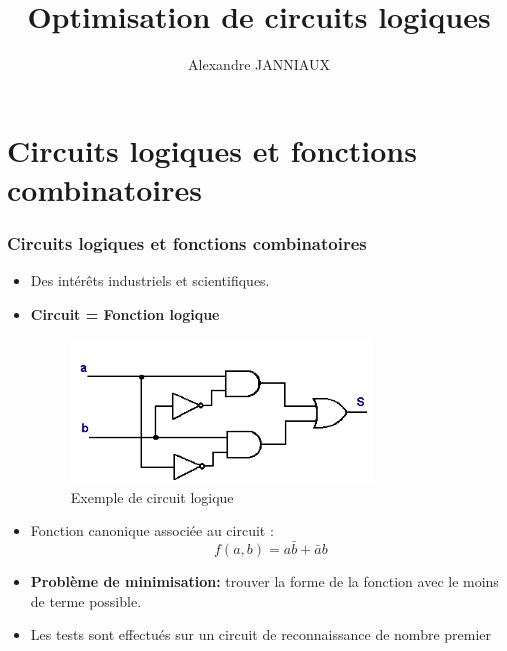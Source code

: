 \documentclass[handout]{beamer}
\title{Optimisation de circuits logiques}
\author{Alexandre JANNIAUX}
\date{}
\begin{document}
\begin{frame}
  \maketitle
  \tableofcontents
\end{frame}

\section{Circuits logiques et fonctions combinatoires}
\begin{frame}
  \frametitle{Circuits logiques et fonctions combinatoires}
  
  \begin{itemize}

   \item Des intérêts industriels et scientifiques.
   \vfill\null
  
   \item \textbf{Circuit = Fonction logique}
   \begin{figure}[p]
   \includegraphics[width=8cm]{circuit_logique2.png}
   \caption{Exemple de circuit logique }
   \label{fig:circ1}
  \end{figure}
  
  \item Fonction canonique associée au circuit : \[f(a,b) = a\bar{b} + \bar{a}b\]
  \vfill\null

  \item\textbf{Problème de minimisation: } trouver la forme de la fonction avec le moins de terme possible.
  \vfill\null
  
  
  \item Les tests sont effectués sur un circuit de reconnaissance de nombre premier

\end{itemize}
\end{frame}
\end{document}
